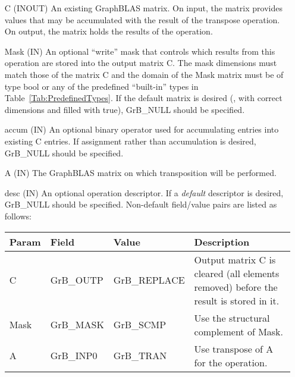 \begin{itemize}[leftmargin=1.1in]
    \item[{\sf C}]    ({\sf INOUT}) An existing GraphBLAS matrix. On input,
    the matrix provides values that may be accumulated with the result of the
    transpose operation.  On output, the matrix holds the results of the
    operation.

    \item[{\sf Mask}] ({\sf IN}) An optional ``write'' mask that controls which
    results from this operation are stored into the output matrix {\sf C}. The 
    mask dimensions must match those of the matrix {\sf C} and the domain of the 
    {\sf Mask} matrix must be of type {\sf bool} or any of the predefined 
    ``built-in'' types in Table~\ref{Tab:PredefinedTypes}.  If the default
    matrix is desired (\ie, with correct dimensions and filled with {\sf true}), 
    {\sf GrB\_NULL} should be specified.

    \item[{\sf accum}] ({\sf IN}) An optional binary operator used for accumulating
    entries into existing {\sf C} entries.
    If assignment rather than accumulation is
    desired, {\sf GrB\_NULL} should be specified.

    \item[{\sf A}]     ({\sf IN}) The GraphBLAS matrix on which
    transposition will be performed.

    \item[{\sf desc}] ({\sf IN}) An optional operation descriptor. If
    a \emph{default} descriptor is desired, {\sf GrB\_NULL} should be
    specified. Non-default field/value pairs are listed as follows:  \\

    \begin{tabular}{lllp{2.5in}}
        Param & Field  & Value & Description \\
        \hline
        {\sf C}    & {\sf GrB\_OUTP} & {\sf GrB\_REPLACE} & Output matrix {\sf C}
        is cleared (all elements removed) before the result is stored in it.\\

        {\sf Mask} & {\sf GrB\_MASK} & {\sf GrB\_SCMP}   & Use the structural
        complement of {\sf Mask}. \\

        {\sf A}    & {\sf GrB\_INP0} & {\sf GrB\_TRAN}   & Use transpose of {\sf A}
        for the operation. \\
    \end{tabular}
\end{itemize}


